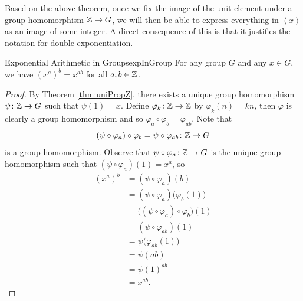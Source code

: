 \documentclass[math]{amznotes}
\theoremstyle{remark}
\newcommand{\cyclic}[1]{\left\langle#1\right\rangle}
\newcommand{\0}{\mathbf{0}}
\newcommand{\1}{\mathbf{1}}
\begin{document}
Based on the above theorem, once we fix the image of the unit element under a group homomorphism $\mathbb{Z} \to G$, we will then be able to express everything in $\cyclic{x}$ as an image of some integer. A direct consequence of this is that it justifies the notation for double exponentiation.
\begin{corbox}{Exponential Arithmetic in Groups}{expInGroup}
    For any group $G$ and any $x \in G$, we have $\left(x^a\right)^b = x^{ab}$ for all $a, b \in \mathbb{Z}$.
    \tcblower
    \begin{proof}
        By Theorem \ref{thm:uniPropZ}, there exists a unique group homomorphism $\psi \colon \mathbb{Z} \to G$ such that $\psi\left(1\right) = x$. Define $\varphi_k \colon \mathbb{Z} \to \mathbb{Z}$ by $\varphi_k\left(n\right) = kn$, then $\varphi$ is clearly a group homomorphism and so $\varphi_{a} \circ \varphi_b = \varphi_{ab}$. Note that 
        \begin{equation*}
            \left(\psi \circ \varphi_a\right) \circ \varphi_b = \psi \circ \varphi_{ab} \colon \mathbb{Z} \to G
        \end{equation*}
        is a group homomorphism. Observe that $\psi \circ \varphi_a \colon \mathbb{Z} \to G$ is the unique group homomorphism such that $\left(\psi \circ \varphi_a\right)\left(1\right) = x^a$, so 
        \begin{align*}
            \left(x^a\right)^b & = \left(\psi \circ \varphi_a\right)\left(b\right) \\
            & = \left(\psi \circ \varphi_a\right)\bigl(\varphi_b\left(1\right)\bigr) \\
            & = \bigl(\left(\psi \circ \varphi_a\right) \circ \varphi_b\bigr)\left(1\right) \\
            & = \left(\psi \circ \varphi_{ab}\right)\left(1\right) \\
            & = \psi\bigl(\varphi_{ab}\left(1\right)\bigr) \\
            & = \psi\left(ab\right) \\
            & = \psi\left(1\right)^{ab} \\
            & = x^{ab}. 
        \end{align*} 
    \end{proof}
\end{corbox}
\end{document}
